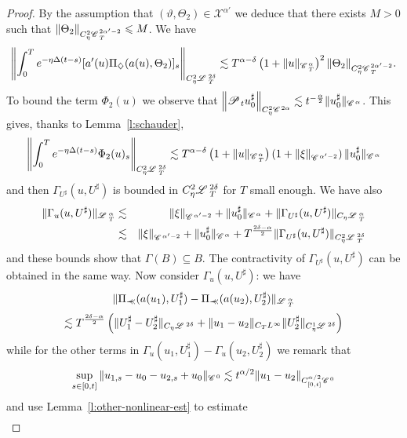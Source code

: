 \documentclass[11pt,reqno]{amsart}
\newcommand{\nocomma}{}
\newcommand{\precprec}{\prec\!\!\!\prec}
\newcommand{\CC}{\mathscr{C} \hspace{.1em}}
\newcommand{\LL}{\mathscr{L} \hspace{.2em}}
\newcommand{\PP}{\mathscr{P} \hspace{.1em}}
\begin{document}
\begin{proof}
  By the assumption that $(\vartheta, \Theta_2) \in \mathcal{X}^{\alpha'}$ we
  deduce that there exists $M > 0$ such that $\| \Theta_2 \|_{C_{\eta}^2
  \CC_T^{2 \alpha' - 2}} \leqslant M$. We have
  \[ \left\| \int_0^T e^{- \eta \Delta (t - s)} [a' (u) \Pi_{\nocomma
     \diamondsuit} (a (u), \Theta_2)]_s \right\|_{C^2_{\eta} \LL_T^{2 \delta}}
     \lesssim T^{\alpha - \delta} \left( 1 + \| u \|_{\CC^{\alpha}_T}
     \right)^2 \| \Theta_2 \|_{C_{\eta}^2 \CC_T^{2 \alpha' - 2}} . \]
  To bound the term $\Phi_2 (u)$ we observe that $\left\| \PP_t u^{\sharp}_0
  \right\|_{C_{\eta}^2 \CC^{2 \alpha}} \lesssim t^{- \frac{\alpha}{2}} \|
  u^{\sharp}_0 \|_{\CC^{\alpha}}$. This gives, thanks to
  Lemma~\ref{l:schauder},
  \[ \left\| \int_0^T e^{- \eta \Delta (t - s)} \Phi_2 (u)_s
     \right\|_{C^2_{\eta} \LL_T^{2 \delta}} \lesssim T^{\alpha - \delta}
     \left( 1 + \| u \|_{\CC^{\alpha}_T} \right) \left( 1 + \| \xi
     \|_{\CC^{\alpha' - 2}} \right) \| u^{\sharp}_0 \|_{\CC^{\alpha}} \]
  and then $\Gamma_{U^{\sharp}} (u, U^{\sharp})$ is bounded in $C^2_{\eta}
  \LL_T^{2 \delta}$ for $T$ small enough. We have also
  \begin{eqnarray*}
    \| \Gamma_u (u, U^{\sharp}) \|_{\LL^{\alpha}_T} & \lesssim & \| \xi
    \|_{\CC^{\alpha' - 2}} + \| u^{\sharp}_0 \|_{\CC^{\alpha}} + \|
    \Gamma_{U^{\sharp}} (u, U^{\sharp}) \|_{C_{\eta} \LL_T^{\alpha}}\\
    & \lesssim & \| \xi \|_{\CC^{\alpha' - 2}} + \| u^{\sharp}_0
    \|_{\CC^{\alpha}} + T^{\frac{2 \delta - \alpha}{2}} \| \Gamma_{U^{\sharp}}
    (u, U^{\sharp}) \|_{C^2_{\eta} \LL_T^{2 \delta}}
  \end{eqnarray*}
  and these bounds show that $\Gamma (B) \subseteq B$. The contractivity of
  $\Gamma_{U^{\sharp}} (u, U^{\sharp})$ can be obtained in the same way. Now
  consider $\Gamma_u (u, U^{\sharp})$: we have
  \[ \| \Pi_{\precprec} (a (u_1), U_1^{\sharp}) - \Pi_{\precprec} (a (u_2),
     U_2^{\sharp}) \|_{\LL^{\alpha}_T} \]
  \[ \lesssim T^{\frac{2 \delta - \alpha}{2}} \left( \| U^{\sharp}_1 -
     U^{\sharp}_2 \|_{C_{\eta} \LL^{2 \delta}} + \| u_1 - u_2 \|_{C_T
     L^{\infty}} \| U^{\sharp}_2 \|_{C_{\eta}^1 \LL^{2 \delta}} \right) \]
  while for the other terms in $\Gamma_u (u_1, U^{\sharp}_1) - \Gamma_u (u_2,
  U^{\sharp}_2)$ we remark that
  \[ \sup_{s \in [0, t]} \| u_{1, s} - u_0 - u_{2, s} + u_0 \|_{\CC^0}
     \lesssim t^{\alpha / 2} \| u_1 - u_2 \|_{C_{[0, t]}^{\alpha / 2} \CC^0}
  \]
  and use Lemma~\ref{l:other-nonlinear-est} to estimate
  \begin{eqnarray*}

\end{eqnarray*}
\end{proof}
\end{document}
